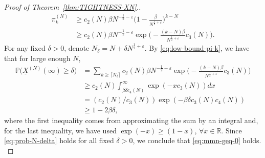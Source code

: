 \documentclass[11pt, reqno]{article}
\numberwithin{equation}{section}
\numberwithin{theorem}{section}
\newcommand{\R}{\mathbb{R}}                 %
\newcommand{\PP}{\mathbb{P}}  				%
\begin{document}
\begin{proof}[Proof of Theorem~\ref{thm:TIGHTNESS-XN}.]
{\begin{equation}\label{eq:low-bound-pi-k}
    \begin{split}
        \pi^{(N)}_k&\geq  c_2(N)\beta N^{-\frac{1}{2}-\varepsilon}\big(1-\frac{\beta}{N^{\frac{1}{2}+\varepsilon}}\big)^{k-N}\\
        &\geq c_2(N)\beta N^{-\frac{1}{2}-\varepsilon}\exp\big(-\frac{(k-N)\beta}{N^{\frac{1}{2}+\varepsilon}}c_3(N)\big).
    \end{split}
\end{equation}
For any fixed $\delta>0$, denote $N_{\delta}=N+\delta N^{\frac{1}{2}+\varepsilon}$. By \eqref{eq:low-bound-pi-k}, we have that for large enough $N$,
\begin{equation}\label{eq:prob-N-delta}
    \begin{split}
        \PP\big(\underline{X}^{(N)}(\infty)\ge \delta\big)&=\sum_{k\geq \lceil N_{\delta} \rceil}c_2(N)\beta N^{-\frac{1}{2}-\varepsilon}\exp\big(-\frac{(k-N)\beta}{N^{\frac{1}{2}+\varepsilon}}c_3(N)\big)\\
        &\geq c_2(N)\int_{\beta\delta c_4(N)}^{\infty}\exp(-xc_3(N))dx\\
        &=(c_2(N)/c_3(N))\exp(-\beta\delta c_3(N)c_4(N))\\
        &\geq 1-2\beta\delta,
    \end{split}
\end{equation}
where the first inequality comes from approximating the sum by an integral and, for the last inequality, we have used $\exp(-x)\geq (1-x)$, $\forall x \in \R$.
Since \eqref{eq:prob-N-delta} holds for all fixed $\delta>0$, we conclude that \eqref{eq:mmn-geq-0} holds.}\\


\end{proof}
\end{document}
